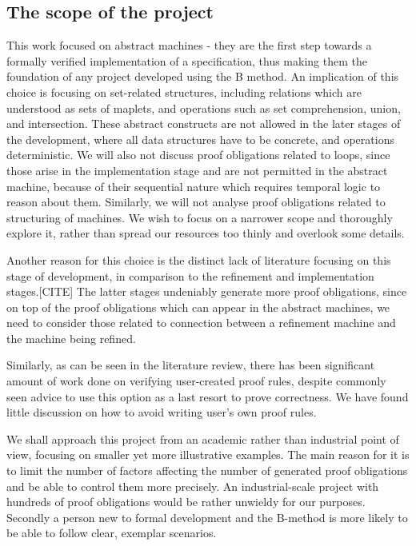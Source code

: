 \documentclass[11pt,journal]{IEEEtran}
\begin{document}
	\subsection{The scope of the project}
	This work focused on abstract machines - they are the first step towards a formally verified implementation of a specification, thus making them the foundation of any project developed using the B method. An implication of this choice is focusing on set-related structures, including relations which are understood as sets of maplets, and operations such as set comprehension, union, and intersection. These abstract constructs are not allowed in the later stages of the development, where all data structures have to be concrete, and operations deterministic. We will also not discuss proof obligations related to loops, since those arise in the implementation stage and are not permitted in the abstract machine, because of their sequential nature which requires temporal logic to reason about them. Similarly, we will not analyse proof obligations related to structuring of machines. We wish to focus on a narrower scope and thoroughly explore it, rather than spread our resources too thinly and overlook some details.
		
	Another reason for this choice is the distinct lack of literature focusing on this stage of development, in comparison to the refinement and implementation stages.[CITE] The latter stages undeniably generate more proof obligations, since on top of the proof obligations which can appear in the abstract machines, we need to consider those related to connection between a refinement machine and the machine being refined.
	
	Similarly, as can be seen in the literature review, there has been significant amount of work done on verifying user-created proof rules, despite commonly seen advice to use this option as a last resort to prove correctness. We have found little discussion on how to avoid writing user's own proof rules.
	
	We shall approach this project from an academic rather than industrial point of view, focusing on smaller yet more illustrative examples. The main reason for it is to limit the number of factors affecting the number of generated proof obligations and be able to control them more precisely. An industrial-scale project with hundreds of proof obligations would be rather unwieldy for our purposes. Secondly a person new to formal development and the B-method is more likely to be able to follow clear, exemplar scenarios. 
	
\end{document}
